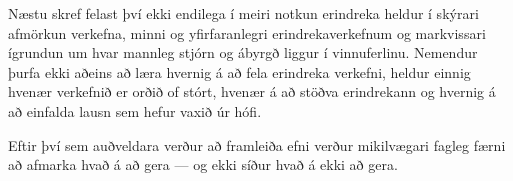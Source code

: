 \documentclass{kennsluakademia_conf}
\begin{document}

Næstu skref felast því ekki endilega í meiri notkun erindreka heldur í
skýrari afmörkun verkefna, minni og yfirfaranlegri erindrekaverkefnum og
markvissari ígrundun um hvar mannleg stjórn og ábyrgð liggur í
vinnuferlinu. Nemendur þurfa ekki aðeins að læra hvernig á að fela
erindreka verkefni, heldur einnig hvenær verkefnið er orðið of stórt,
hvenær á að stöðva erindrekann og hvernig á að einfalda lausn sem hefur
vaxið úr hófi.

Eftir því sem auðveldara verður að framleiða efni verður mikilvægari
fagleg færni að afmarka hvað á að gera --- og ekki síður hvað á ekki að
gera.



\end{document}
